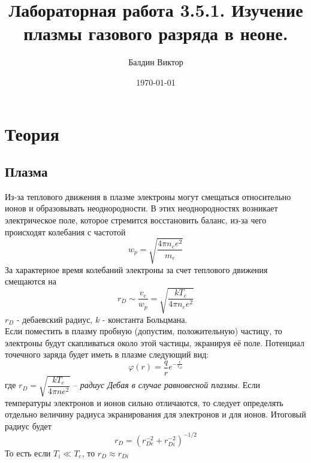 \documentclass[a4paper, 12pt]{article}
\title{Лабораторная работа 3.5.1. Изучение плазмы газового разряда в неоне.}
\author{Балдин Виктор}
\date{\today}
\begin{document}
        \maketitle
        \section*{Теория}
        \subsection*{Плазма}

        Из-за теплового движения в плазме электроны могут смещаться относительно ионов и образовывать неоднородности. В этих неоднородностях возникает электрическое поле, которое стремится восстановить баланс, из-за чего происходят колебания с частотой
        \[w_p = \sqrt{\frac{4\pi n_e e^2}{m_e}}\]
        За характерное время колебаний электроны за счет теплового движения смещаются на
        \[r_D \sim \frac{v_e}{w_p} = \sqrt{\frac{kT_e}{4\pi n_e e^2}}\]
        $r_D$ - дебаевский радиус, $k$ - константа Больцмана.\\
        Если поместить в плазму пробную (допустим, положительную) частицу, то электроны будут скапливаться около этой частицы, экранируя её поле. Потенциал точечного заряда будет иметь в плазме следующий вид:
        \[\varphi(r) = \frac{q}{r}e^{-\frac{r}{r_D}}\]
        где $r_D = \sqrt{\dfrac{kT_e}{4\pi n e^2}}$ -- \textit{радиус Дебая в случае равновесной плазмы}. Если температуры электронов и ионов сильно отличаются, то следует определять отдельно величину радиуса экранирования для электронов и для ионов. Итоговый радиус будет
        \[r_D = (r_{De}^{-2} + r_{Di}^{-2})^{-1/2}\]
        То есть если $T_i \ll T_e$, то $r_D \approx r_{Di}$
\end{document}
